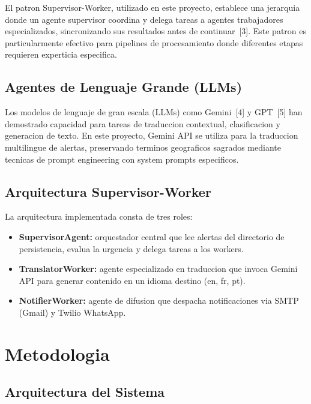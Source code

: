\documentclass[10pt,twocolumn,a4paper]{article}
\begin{document}
El patron Supervisor-Worker, utilizado en este proyecto, establece
una jerarquia donde un agente supervisor coordina y delega tareas a
agentes trabajadores especializados, sincronizando sus resultados
antes de continuar~[3]. Este patron es particularmente efectivo
para pipelines de procesamiento donde diferentes etapas requieren
experticia especifica.

\subsection{Agentes de Lenguaje Grande (LLMs)}

Los modelos de lenguaje de gran escala (LLMs) como Gemini~[4] y
GPT~[5] han demostrado capacidad para tareas de traduccion
contextual, clasificacion y generacion de texto. En este proyecto,
Gemini API se utiliza para la traduccion multilingue de alertas,
preservando terminos geograficos sagrados mediante tecnicas de
prompt engineering con system prompts especificos.

\subsection{Arquitectura Supervisor-Worker}

La arquitectura implementada consta de tres roles:
\begin{itemize}
  \item \textbf{SupervisorAgent:} orquestador central que lee
  alertas del directorio de persistencia, evalua la urgencia y
  delega tareas a los workers.
  \item \textbf{TranslatorWorker:} agente especializado en
  traduccion que invoca Gemini API para generar contenido en un
  idioma destino (en, fr, pt).
  \item \textbf{NotifierWorker:} agente de difusion que despacha
  notificaciones via SMTP (Gmail) y Twilio WhatsApp.
\end{itemize}

\section{Metodologia}

\subsection{Arquitectura del Sistema}
\end{document}
